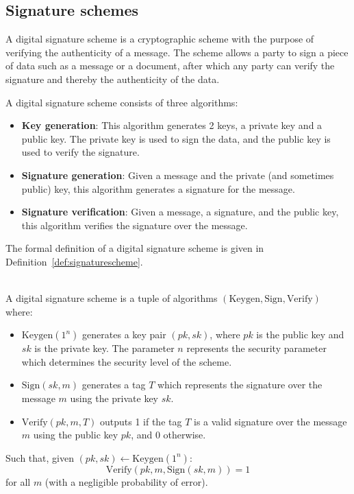 \documentclass[11pt,a4paper]{report}
\theoremstyle{definition}
\begin{document}
\subsection{Signature schemes}
\label{sec:signatureschemes}
A digital signature scheme is a cryptographic scheme with the purpose of verifying the authenticity of a message. The scheme allows a party to sign a piece of data such as a message or a document, after which any party can verify the signature and thereby the authenticity of the data.

A digital signature scheme consists of three algorithms:
\begin{itemize}
  \item \textbf{Key generation}: This algorithm generates 2 keys, a private key and a public key. The private key is used to sign the data, and the public key is used to verify the signature.
  \item \textbf{Signature generation}: Given a message and the private (and sometimes public) key, this algorithm generates a signature for the message.
  \item \textbf{Signature verification}: Given a message, a signature, and the public key, this algorithm verifies the signature over the message.
\end{itemize}
The formal definition of a digital signature scheme is given in Definition~\ref{def:signaturescheme}.

\begin{definition}~\\
  \label{def:signaturescheme}
  A digital signature scheme is a tuple of algorithms $(\text{Keygen}, \text{Sign}, \text{Verify})$ where:
  \begin{itemize}
    \item $\text{Keygen}(1^n)$ generates a key pair $(pk, sk)$, where $pk$ is the public key and $sk$ is the private key. The parameter $n$ represents the security parameter which determines the security level of the scheme.
    \item $\text{Sign}(sk, m)$ generates a tag $T$ which represents the signature over the message $m$ using the private key $sk$.
    \item $\text{Verify}(pk, m, T)$ outputs 1 if the tag $T$ is a valid signature over the message $m$ using the public key $pk$, and 0 otherwise.
  \end{itemize}
  \pagebreak
  Such that, given $(pk, sk) \leftarrow \text{Keygen}(1^n)$:
  \[
    \text{Verify}(pk, m, \text{Sign}(sk, m)) = 1
  \]
  for all $m$ (with a negligible probability of error).
\end{definition}
\end{document}
